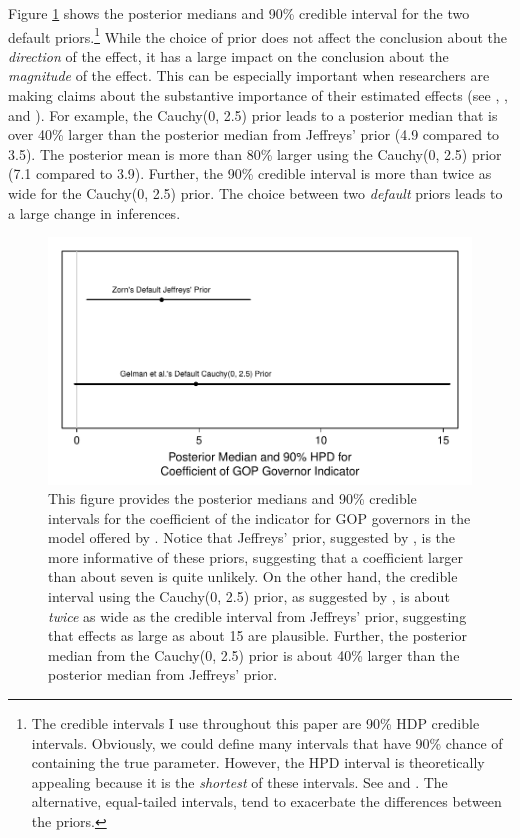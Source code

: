 \documentclass[12pt]{article}
\begin{document}
Figure \ref{fig:br-coef-illustrate-importance} shows the posterior medians and 90\% credible interval for the two default priors.\footnote{The credible intervals I use throughout this paper are 90\% HDP credible intervals. Obviously, we could define many intervals that have 90\% chance of containing the true parameter. However, the HPD interval is theoretically appealing because it is the \emph{shortest} of these intervals. See \citet[esp. pp. 48-51]{Gill2008} and \citet[esp. p. 448]{CasellaBerger2002}. The alternative, equal-tailed intervals, tend to exacerbate the differences between the priors.} While the choice of prior does not affect the conclusion about the \emph{direction} of the effect, it has a large impact on the conclusion about the \emph{magnitude} of the effect. This can be especially important when researchers are making claims about the substantive importance of their estimated effects (see \citealt{Rainey2014}, \citealt{Gross2014}, and \citealt{McCaskeyRainey2014}). For example, the Cauchy(0, 2.5) prior leads to a posterior median that is over 40\% larger than the posterior median from Jeffreys' prior (4.9 compared to 3.5). The posterior mean is more than 80\% larger using the Cauchy(0, 2.5) prior (7.1 compared to 3.9). Further, the 90\% credible interval is more than twice as wide for the Cauchy(0, 2.5) prior. The choice between two \emph{default} priors leads to a large change in inferences.

\begin{figure}[H]
\begin{center}
\includegraphics[scale = .8]{figs/br-coef-illustrate-importance.pdf}
\caption{This figure provides the posterior medians and 90\% credible intervals for the coefficient of the indicator for GOP governors in the model offered by \cite{BarrilleauxRainey2014}. Notice that Jeffreys' prior, suggested by \cite{Zorn2005}, is the more informative of these priors, suggesting that a coefficient larger than about seven is quite unlikely. On the other hand, the credible interval using the Cauchy(0, 2.5) prior, as suggested by \cite{Gelmanetal2008}, is about \emph{twice} as wide as the credible interval from Jeffreys' prior, suggesting that effects as large as about 15 are plausible. Further, the posterior median from the Cauchy(0, 2.5) prior is about 40\% larger than the posterior median from Jeffreys' prior.}\label{fig:br-coef-illustrate-importance}
\end{center}
\end{figure}
\end{document}
